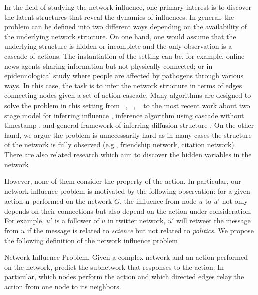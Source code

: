 {In the field of studying the network influence, one primary interest is to discover the latent structures that reveal the dynamics of influences.
In general, the problem can be defined into two different ways depending on the availability of the underlying network structure.
On one hand, one would assume that the underlying structure is hidden or incomplete and the only observation is a cascade of actions.
The instantiation of the setting can be, for example, online news agents sharing information but not physically connected; or in epidemiological study where people are affected by pathogens through various ways.
In this case, the task is to infer the network structure in terms of edges connecting nodes given a set of action cascade.
Many algorithms are designed to solve the problem in this setting from \netinf\ \citep{GomezRodriguez10inferring}, \netrate\ \citep{Rodrigues11unconvering}, \ \citep{Du12learning} to the most recent work about two stage model for inferring influence \citep{Du14influence}, inference algorithm using cascade without timestamp \citep{Amin14learning}, and general framework of inferring diffusion structure \citep{Daneshmand14estimating}.
On the other hand, we argue the problem is unnecessarily hard as in many cases the structure of the network is fully observed (e.g., friendship network, citation network).
There are also related research which aim to discover the hidden variables in the network \citep{Lovrek08prediction,Goyal10learning}

However, none of them consider the property of the action.
In particular, our network influence problem is motivated by the following observation: for a given action $\mathbf {a}$ performed on the network $G$, the influence from node $u$ to $u'$ not only depends on their connections but also depend on the action under consideration.
For example, $u'$ is a follower of $u$ in twitter network, $u'$ will retweet the message from $u$ if the message is related to \textit{science} but not related to \textit{politics}.
We propose the following definition of the network influence problem
\begin{definition}{Network Influence Problem.}
	Given a complex network and an action performed on the network, predict the subnetwork that responses to the action. In particular, which nodes perform the action and which directed edges relay the action from one node to its neighbors.
\end{definition}

}

